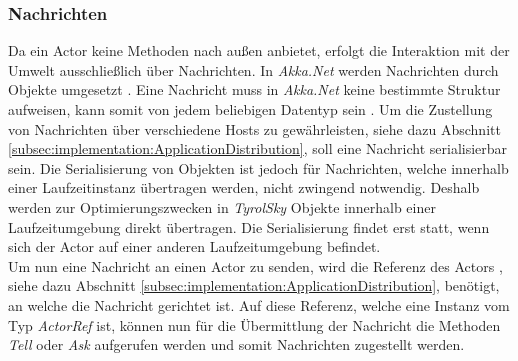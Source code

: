 \subsubsection{Nachrichten}\label{subsec:implementation:akkaMessaging}
Da ein Actor  keine Methoden nach außen anbietet, erfolgt die Interaktion mit der Umwelt ausschließlich über Nachrichten. In \textit{Akka.Net} werden Nachrichten durch Objekte umgesetzt \citep{akkaInAction}. Eine Nachricht  muss in \textit{Akka.Net} keine bestimmte Struktur aufweisen, kann somit von jedem beliebigen Datentyp sein \citep{akika}. Um  die Zustellung von Nachrichten über verschiedene Hosts zu gewährleisten, siehe dazu Abschnitt \ref{subsec:implementation:ApplicationDistribution}, soll eine Nachricht serialisierbar sein. Die Serialisierung von Objekten ist jedoch für Nachrichten, welche innerhalb einer Laufzeitinstanz übertragen werden, nicht zwingend notwendig. Deshalb werden zur Optimierungszwecken in \textit{TyrolSky} Objekte innerhalb einer Laufzeitumgebung direkt übertragen. Die Serialisierung findet erst statt, wenn sich der Actor auf einer anderen Laufzeitumgebung befindet. \\
% 
% 
Um nun eine Nachricht an einen Actor zu senden, wird die Referenz des Actors , siehe dazu Abschnitt \ref{subsec:implementation:ApplicationDistribution}, benötigt, an welche die Nachricht gerichtet ist. Auf diese Referenz, welche eine Instanz vom Typ \textit{ActorRef} ist, können nun für die Übermittlung der Nachricht die Methoden \textit{Tell} oder \textit{Ask} aufgerufen werden und somit Nachrichten zugestellt werden.
% 
% 
